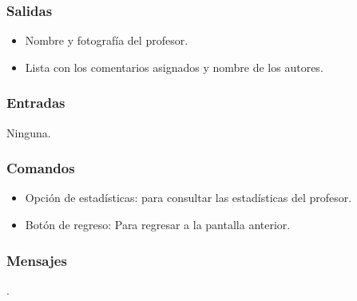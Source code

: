 \subsubsection{Salidas}
	\begin{itemize}
		\item Nombre y fotografía del profesor.
		\item Lista con los comentarios asignados y nombre de los autores.
	\end{itemize}

\subsubsection{Entradas}
	\noindent
	Ninguna.

\subsubsection{Comandos}
	\begin{itemize}
		\item Opción de estadísticas: para consultar las estadísticas del profesor.
		\item Botón de regreso: Para regresar a la pantalla anterior.
	\end{itemize}

\subsubsection{Mensajes}
	\noindent
	.





